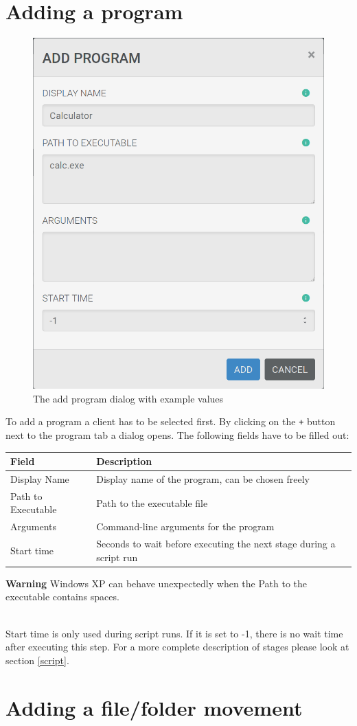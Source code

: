 \documentclass[accentcolor=tud1a, paper=a4, colorback]{tudreport}
\begin{document}
	\section{Adding a program}
	\begin{figure}[h]
		\centering
		\label{add_program}
		\includegraphics[width=.4\textwidth]{add_program}
		\caption{The add program dialog with example values}
	\end{figure}
	To add a program a client has to be selected first. By clicking on the \texttt{+}
	button next to the program tab a dialog opens. The following fields have to be filled
	out:
	\begin{center}
	\begin{tabular}{l|l}
		Field & Description \\\hline
		Display Name &  Display name of the program, can be chosen freely\\
		Path to Executable & Path to the executable file\\
		Arguments & Command-line arguments for the program\\
		Start time & Seconds to wait before executing the next stage during a script run\\
	\end{tabular}
		\begin{tcolorbox}[width=\textwidth, colback=red!30, arc=0pt, boxrule=0pt]
		{\color{red}\textbf{Warning}}\hspace{0.5cm}
		Windows XP can behave unexpectedly when the Path to the executable contains spaces.
		\end{tcolorbox}
	\end{center}
	\\
	Start time is only used during script runs. If it is set to -1, there is
	no wait time after executing this step. For a more complete description of
	stages please look at section \ref{script}.

	\section{Adding a file/folder movement}
\end{document}
